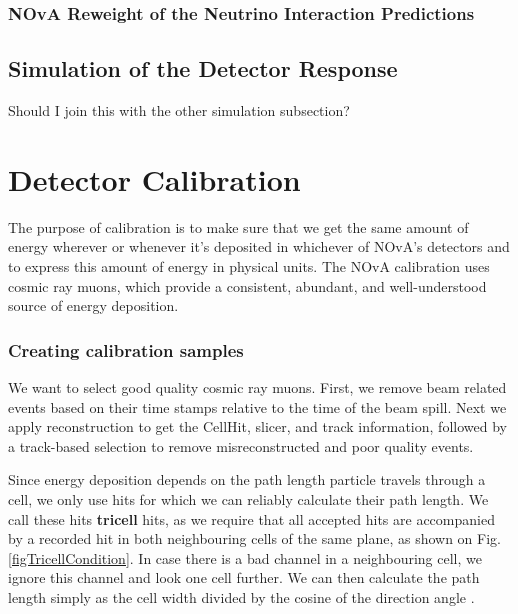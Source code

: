 \subsubsection{NOvA Reweight of the Neutrino Interaction Predictions}

\subsection{Simulation of the Detector Response}
Should I join this with the other simulation subsection?

\section{Detector Calibration}
The purpose of calibration is to make sure that we get the same amount of energy wherever or whenever it's deposited in whichever of NOvA's detectors and to express this amount of energy in physical units. The NOvA calibration uses cosmic ray muons, which provide a consistent, abundant, and well-understood source of energy deposition.



\subsubsection*{Creating calibration samples}\label{secCreatingCalibrationSamples}

We want to select good quality cosmic ray muons. First, we remove beam related events based on their time stamps relative to the time of the beam spill. Next we apply reconstruction to get the CellHit, slicer, and track information, followed by a track-based selection to remove misreconstructed and poor quality events.

Since energy deposition depends on the path length particle travels through a cell, we only use hits for which we can reliably calculate their path length. We call these hits \textbf{tricell} hits, as we require that all accepted hits are accompanied by a recorded hit in both neighbouring cells of the same plane, as shown on Fig. \ref{figTricellCondition}. In case there is a bad channel in a neighbouring cell, we ignore this channel and look one cell further. We can then calculate the path length simply as the cell width divided by the cosine of the direction angle \cite{NOVA-doc-13579,NOVA-doc-7410}.

